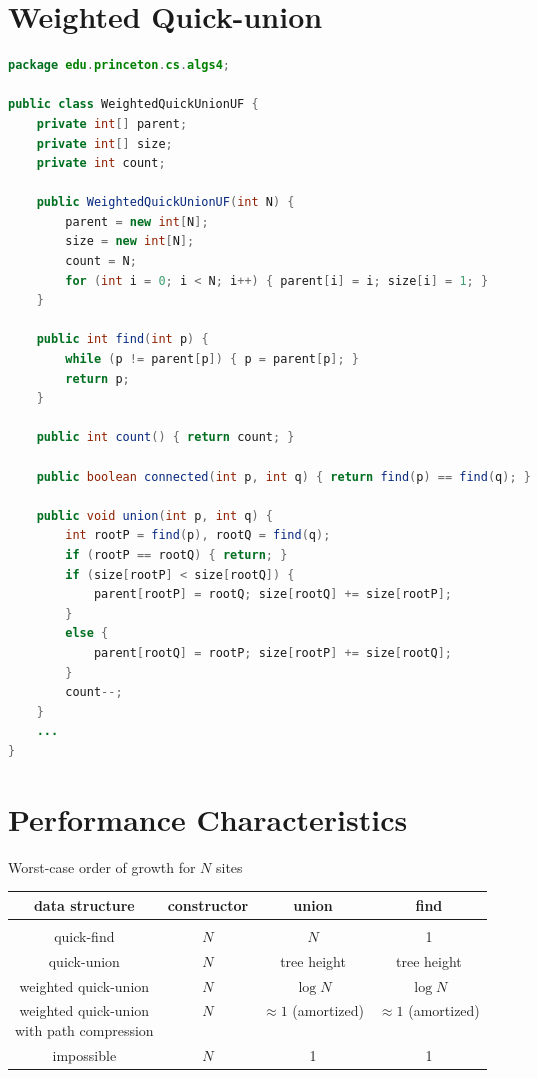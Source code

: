 \documentclass[8pt,a4paper,compress]{beamer}
\begin{document}
\section{Weighted Quick-union}
\begin{frame}[fragile]
\begin{lstlisting}[language=Java]
package edu.princeton.cs.algs4;

public class WeightedQuickUnionUF {
    private int[] parent;
    private int[] size;
    private int count;

    public WeightedQuickUnionUF(int N) {
        parent = new int[N];
        size = new int[N];
        count = N;
        for (int i = 0; i < N; i++) { parent[i] = i; size[i] = 1; }
    }

    public int find(int p) {
        while (p != parent[p]) { p = parent[p]; }
        return p;
    }

    public int count() { return count; }
  
    public boolean connected(int p, int q) { return find(p) == find(q); }

    public void union(int p, int q) {
        int rootP = find(p), rootQ = find(q);
        if (rootP == rootQ) { return; }
        if (size[rootP] < size[rootQ]) {
            parent[rootP] = rootQ; size[rootQ] += size[rootP];
        }
        else {
            parent[rootQ] = rootP; size[rootP] += size[rootQ];
        }
        count--;
    }
    ...
}
\end{lstlisting}
\end{frame}

\section{Performance Characteristics}
\begin{frame}[fragile]
Worst-case order of growth for $N$ sites
\begin{center}
\begin{tabular}{cccc}
data structure & constructor & union & find \\ \hline \\
quick-find & $N$ & $N$ & 1 \\
quick-union & $N$ & tree height & tree height \\
weighted quick-union & $N$ & $\log N$ & $\log N$ \\
\makecell{weighted quick-union \\ with path compression} & $N$ & $\approx 1$ (amortized) & $\approx 1$ (amortized) \\
impossible & $N$ & 1 & 1
\end{tabular} 
\end{center}
\end{frame}
\end{document}
